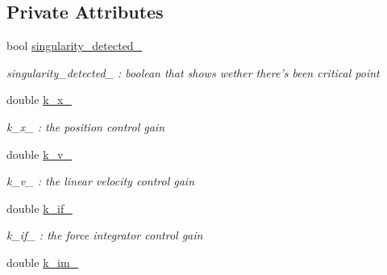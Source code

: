 \subsection*{Private Attributes}
\begin{DoxyCompactItemize}
\item 
\hypertarget{class_skye_geometric_controller_ab5e7e12358398de48747ffec05b779a4}{bool \hyperlink{class_skye_geometric_controller_ab5e7e12358398de48747ffec05b779a4}{singularity\-\_\-detected\-\_\-}}\label{class_skye_geometric_controller_ab5e7e12358398de48747ffec05b779a4}

\begin{DoxyCompactList}\small\item\em singularity\-\_\-detected\-\_\- \-: boolean that shows wether there's been critical point \end{DoxyCompactList}\item 
\hypertarget{class_skye_geometric_controller_ac5b6e324aca728265c20590eae7492ad}{double \hyperlink{class_skye_geometric_controller_ac5b6e324aca728265c20590eae7492ad}{k\-\_\-x\-\_\-}}\label{class_skye_geometric_controller_ac5b6e324aca728265c20590eae7492ad}

\begin{DoxyCompactList}\small\item\em k\-\_\-x\-\_\- \-: the position control gain \end{DoxyCompactList}\item 
\hypertarget{class_skye_geometric_controller_a904f70d115099a3ab0bc7b1bb6e2d7c5}{double \hyperlink{class_skye_geometric_controller_a904f70d115099a3ab0bc7b1bb6e2d7c5}{k\-\_\-v\-\_\-}}\label{class_skye_geometric_controller_a904f70d115099a3ab0bc7b1bb6e2d7c5}

\begin{DoxyCompactList}\small\item\em k\-\_\-v\-\_\- \-: the linear velocity control gain \end{DoxyCompactList}\item 
\hypertarget{class_skye_geometric_controller_ad5bcb155689c05545076c0143a41b134}{double \hyperlink{class_skye_geometric_controller_ad5bcb155689c05545076c0143a41b134}{k\-\_\-if\-\_\-}}\label{class_skye_geometric_controller_ad5bcb155689c05545076c0143a41b134}

\begin{DoxyCompactList}\small\item\em k\-\_\-if\-\_\- \-: the force integrator control gain \end{DoxyCompactList}\item 
\hypertarget{class_skye_geometric_controller_a238e9820bbeab93244b9dc6c804c6529}{double \hyperlink{class_skye_geometric_controller_a238e9820bbeab93244b9dc6c804c6529}{k\-\_\-im\-\_\-}}\label{class_skye_geometric_controller_a238e9820bbeab93244b9dc6c804c6529}


\end{DoxyCompactItemize}
